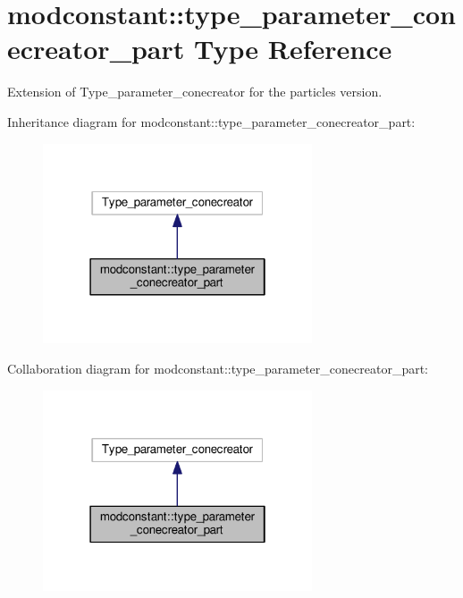 \hypertarget{structmodconstant_1_1type__parameter__conecreator__part}{\section{modconstant\-:\-:type\-\_\-parameter\-\_\-conecreator\-\_\-part Type Reference}
\label{structmodconstant_1_1type__parameter__conecreator__part}
}


Extension of Type\-\_\-parameter\-\_\-conecreator for the particles version.  




Inheritance diagram for modconstant\-:\-:type\-\_\-parameter\-\_\-conecreator\-\_\-part\-:\nopagebreak
\begin{figure}[H]
\begin{center}
\leavevmode
\includegraphics[width=226pt]{structmodconstant_1_1type__parameter__conecreator__part__inherit__graph}
\end{center}
\end{figure}


Collaboration diagram for modconstant\-:\-:type\-\_\-parameter\-\_\-conecreator\-\_\-part\-:\nopagebreak
\begin{figure}[H]
\begin{center}
\leavevmode
\includegraphics[width=226pt]{structmodconstant_1_1type__parameter__conecreator__part__coll__graph}
\end{center}
\end{figure}
